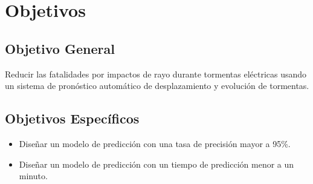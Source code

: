 \section{Objetivos}
\subsection{Objetivo General}

Reducir las fatalidades por impactos de rayo durante tormentas eléctricas 
usando un sistema de pronóstico automático de desplazamiento y evolución de 
tormentas.

\subsection{Objetivos Específicos}
\begin{itemize}

\item Diseñar un modelo de predicción con una tasa de precisión mayor a 95\%.

\item Diseñar un modelo de predicción con un tiempo de predicción menor a un 
minuto.

\end{itemize}





